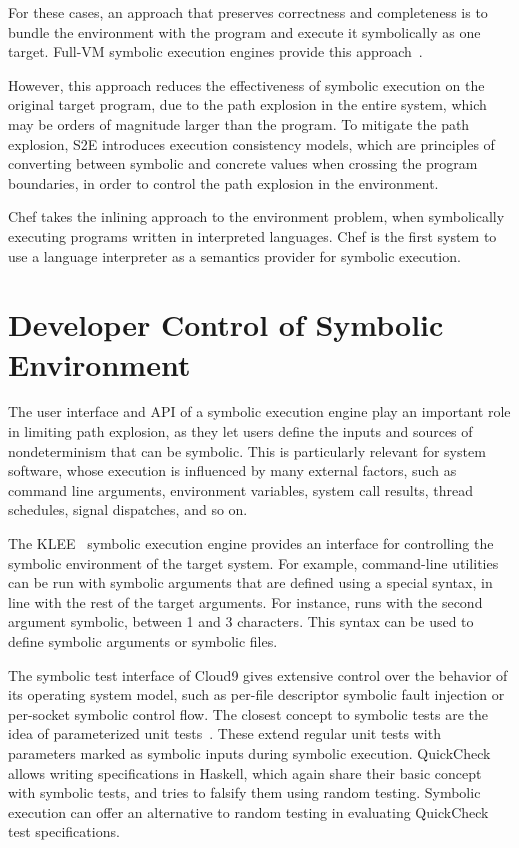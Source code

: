For these cases, an approach that preserves correctness and completeness is to bundle the environment with the program and execute it symbolically as one target.
%
Full-VM symbolic execution engines provide this approach~\cite{s2e,bitBlaze}.

However, this approach reduces the effectiveness of symbolic execution on the original target program, due to the path explosion in the entire system, which may be orders of magnitude larger than the program.
%
To mitigate the path explosion, S2E introduces execution consistency models, which are principles of converting between symbolic and concrete values when crossing the program boundaries, in order to control the path explosion in the environment.

Chef takes the inlining approach to the environment problem, when symbolically executing programs written in interpreted languages.  Chef is the first system to use a language interpreter as a semantics provider for symbolic execution.


\section{Developer Control of Symbolic Environment}

The user interface and API of a symbolic execution engine play an important role in limiting path explosion, as they let users define the inputs and sources of nondeterminism that can be symbolic.  This is particularly relevant for system software, whose execution is influenced by many external factors, such as command line arguments, environment variables, system call results, thread schedules, signal dispatches, and so on.

The KLEE~\cite{klee} symbolic execution engine provides an interface for controlling the symbolic environment of the target system.  For example, command-line utilities can be run with symbolic arguments that are defined using a special syntax, in line with the rest of the target arguments.  For instance,  runs  with the second argument symbolic, between 1 and 3 characters.  This syntax can be used to define symbolic arguments or symbolic files.

The symbolic test interface of Cloud9 gives extensive control over the behavior of its operating system model, such as per-file descriptor symbolic fault injection or per-socket symbolic control flow.
%
The closest concept to symbolic tests are the idea of parameterized unit tests~\cite{tillmann-puts}. These extend regular unit tests with parameters marked as symbolic inputs during symbolic execution.
%
QuickCheck~\cite{quickcheck} allows writing specifications in Haskell, which again share their basic concept with symbolic tests, and tries to falsify them using random testing.  Symbolic execution can offer an alternative to random testing in evaluating QuickCheck test specifications.


